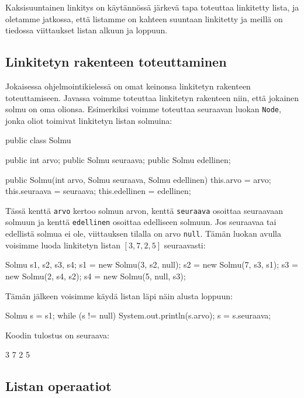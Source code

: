 Kaksisuuntainen linkitys on käytännössä järkevä tapa toteuttaa
linkitetty lista, ja oletamme jatkossa, että listamme on
kahteen suuntaan linkitetty ja meillä on tiedossa viittaukset
listan alkuun ja loppuun.

\subsection{Linkitetyn rakenteen toteuttaminen}

Jokaisessa ohjelmointikielessä on omat keinonsa
linkitetyn rakenteen toteuttamiseen.
Javassa voimme toteuttaa linkitetyn rakenteen niin,
että jokainen solmu on oma olionsa.
Esimerkiksi voimme toteuttaa seuraavan luokan \texttt{Node},
jonka oliot toimivat linkitetyn listan solmuina:

\begin{code}
public class Solmu {
    public int arvo;
    public Solmu seuraava;
    public Solmu edellinen;

    public Solmu(int arvo, Solmu seuraava, Solmu edellinen) {
        this.arvo = arvo;
        this.seuraava = seuraava;
        this.edellinen = edellinen;
    }
}
\end{code}

Tässä kenttä \texttt{arvo} kertoo solmun arvon,
kenttä \texttt{seuraava} osoittaa seuraavaan solmuun
ja kenttä \texttt{edellinen} osoittaa edelliseen solmuun.
Jos seuraavaa tai edellistä solmua ei ole,
viittauksen tilalla on arvo \texttt{null}.
Tämän luokan avulla voisimme luoda linkitetyn listan $[3,7,2,5]$
seuraavasti:

\begin{code}
Solmu s1, s2, s3, s4;
s1 = new Solmu(3, s2, null);
s2 = new Solmu(7, s3, s1);
s3 = new Solmu(2, s4, s2);
s4 = new Solmu(5, null, s3);
\end{code}

Tämän jälkeen voisimme käydä listan läpi näin alusta loppuun:

\begin{code}
Solmu s = s1;
while (s != null) {
    System.out.println(s.arvo);
    s = s.seuraava;
}
\end{code}

Koodin tulostus on seuraava:

\begin{code}
3
7
2
5
\end{code}

\subsection{Listan operaatiot}

